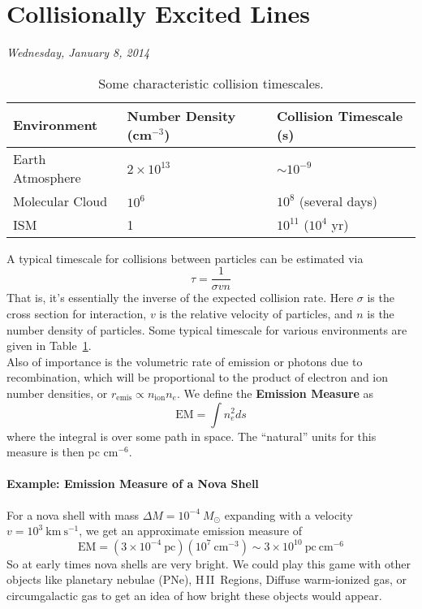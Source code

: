 \documentclass[10pt]{article}
\numberwithin{equation}{section}
\newcommand{\n}{\noindent}
\newcommand{\HII}{H\,II\ }
\begin{document}
\section{Collisionally Excited Lines} %
\label{sec:collisionally_excited_lines} %
\n\textit{Wednesday, January 8, 2014}\\

\begin{table}
  \centering
  \begin{tabular}{l l l}
  Environment & Number Density (cm$^{-3}$) & Collision Timescale (s)\\
  \hline
  Earth Atmosphere & $2\times 10^{13}$ & $\sim 10^{-9}$\\
  Molecular Cloud & $10^6$ & $10^8$ (several days)\\
  ISM & 1 & $10^{11}$ ($10^4$ yr)
  \end{tabular}
  \caption{Some characteristic collision timescales.}
  \label{tab:2.1}
\end{table}
\n A typical timescale for collisions between particles can be estimated via
\begin{equation}
  \label{eq:coll:1} \tau = \frac{1}{\sigma v n}
\end{equation}
That is, it's essentially the inverse of the expected collision rate. Here
$\sigma$ is the cross section for interaction, $v$ is the relative velocity of
particles, and $n$ is the number density of particles. Some typical timescale
for various environments are given in Table~\ref{tab:2.1}.\\

\n Also of importance is the volumetric rate of emission or photons due to
recombination, which will be proportional to the product of electron and ion
number densities, or $r_{\mathrm{emis}}\propto n_{\mathrm{ion}}n_e$. We define
the \textbf{Emission Measure} as
\begin{equation}
  \label{eq:coll:2} \mathrm{EM} = \int n_e^2 ds
\end{equation}
where the integral is over some path in space. The ``natural'' units for this
measure is then pc cm$^{-6}$.
\paragraph{Example: Emission Measure of a Nova Shell} %
\label{par:example_emission_measure_of_a_nova_shell}
  For a nova shell with mass $\Delta M = 10^{-4}\ M_\odot$ expanding with a
  velocity $v=10^3\ \mathrm{km\ s^{-1}}$, we get an approximate emission
  measure of
  \begin{equation}
    \mathrm{EM} = (3\times 10^{-4}\ \mathrm{pc})(10^7\ \mathrm{cm^{-3}}) \sim
    3\times 10^{10}\ \mathrm{pc\ cm^{-6}}
  \end{equation}
  So at early times nova shells are very bright. We could play this game with
  other objects like planetary nebulae (PNe), \HII Regions, Diffuse warm-ionized
  gas, or circumgalactic gas to get an idea of how bright these objects would
  appear.
\end{document}
